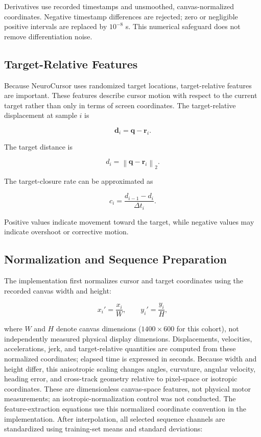 \documentclass[conference]{IEEEtran}
\begin{document}
Derivatives use recorded timestamps and unsmoothed, canvas-normalized
coordinates. Negative timestamp differences are rejected; zero or negligible
positive intervals are replaced by $10^{-8}$ s. This numerical safeguard does
not remove differentiation noise.

\subsection{Target-Relative Features}

Because NeuroCursor uses randomized target locations, target-relative features are important. These features describe cursor motion with respect to the current target rather than only in terms of screen coordinates. The target-relative displacement at sample $i$ is

\begin{equation}
\mathbf{d}_i
=
\mathbf{q}-\mathbf{r}_i.
\label{eq:target_relative_displacement}
\end{equation}

The target distance is

\begin{equation}
d_i
=
\left\|
\mathbf{q}-\mathbf{r}_i
\right\|_2.
\label{eq:target_distance}
\end{equation}

The target-closure rate can be approximated as

\begin{equation}
c_i
=
\frac{d_{i-1}-d_i}{\Delta t_i}.
\label{eq:closure_rate}
\end{equation}

Positive values indicate movement toward the target, while negative values
may indicate overshoot or corrective motion.

\subsection{Normalization and Sequence Preparation}

The implementation first normalizes cursor and target coordinates using the
recorded canvas width and height:

\begin{equation}
x_i'=\frac{x_i}{W},
\qquad
y_i'=\frac{y_i}{H},
\label{eq:spatial_normalization}
\end{equation}

where $W$ and $H$ denote canvas dimensions ($1400\times600$ for this cohort),
not independently measured physical display dimensions. Displacements,
velocities, accelerations, jerk, and target-relative quantities are computed
from these normalized coordinates; elapsed time is expressed in seconds.
Because width and height differ, this anisotropic scaling changes angles,
curvature, angular velocity, heading error, and cross-track geometry relative
to pixel-space or isotropic coordinates. These are dimensionless canvas-space
features, not physical motor measurements; an isotropic-normalization control
was not conducted.
The feature-extraction equations use this normalized coordinate convention in
the implementation. After interpolation, all selected sequence channels are
standardized using training-set means and standard deviations:
\end{document}
